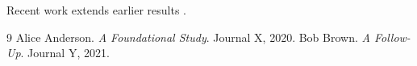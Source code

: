 Recent work \citet{alice2020,bob2021} extends earlier results \citep{alice2020,bob2021}.

\begin{thebibliography}{9}
 Alice Anderson. \emph{A Foundational Study}. Journal X, 2020.
 Bob Brown. \emph{A Follow-Up}. Journal Y, 2021.
\end{thebibliography}
